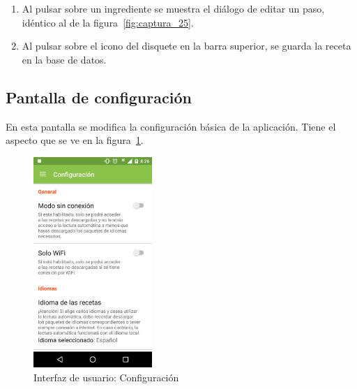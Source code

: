 \begin{enumerate}
\item Al pulsar sobre un ingrediente se muestra el diálogo de editar un
  paso, idéntico al de la figura~\ref{fig:captura_25}.

\item Al pulsar sobre el icono del disquete en la barra superior, se guarda la
  receta en la base de datos.
\end{enumerate}


\subsection{Pantalla de configuración}

En esta pantalla se modifica la configuración básica de la aplicación. Tiene el
aspecto que se ve en la figura~\ref{fig:captura_26}.

\begin{figure}[htbp]
  \centering
  \includegraphics[width=0.4\textwidth]{cap5/img/captura_26}
  \caption{Interfaz de usuario: Configuración}
  \label{fig:captura_26}
\end{figure}

